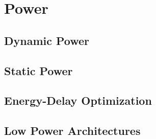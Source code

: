 \section{Power}

\subsection{Dynamic Power}

\subsection{Static Power}

\subsection{Energy-Delay Optimization}

\subsection{Low Power Architectures}
